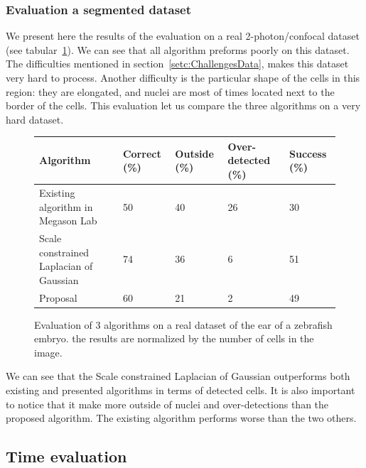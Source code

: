 \subsubsection{Evaluation a segmented dataset}

We present here the results of the evaluation on a real 2-photon/confocal dataset (see tabular~\ref{tab:realEval}). We can see that all algorithm preforms poorly on this dataset.
The difficulties mentioned in section~\ref{setc:ChallengesData}, makes this dataset very hard to process. Another difficulty is the particular shape of the cells in this region: they are elongated, and nuclei are most of times located next to the border of the cells.
This evaluation let us compare the three algorithms on a very hard dataset.
\begin{figure}[htb]
\begin{center}
\begin{tabular}{|p{2.5cm}|l|l|p{1.3cm}|l|}
\hline Algorithm & Correct (\%) & Outside (\%) & Over-detected (\%) & Success (\%) \\ 
\hline Existing algorithm in Megason Lab & 50 & 40 & 26 & 30 \\ 
\hline Scale constrained Laplacian of Gaussian &  74 & 36 & 6 & 51 \\ 
\hline Proposal & 60 & 21 & 2 & 49 \\
\hline
\end{tabular}
\end{center}
\caption{Evaluation of 3 algorithms on a real dataset of the ear of a zebrafish embryo. the results are normalized by the number of cells in the image.}
\label{tab:realEval}
\end{figure}

We can see that the Scale constrained Laplacian of Gaussian outperforms both existing and presented algorithms in terms of detected cells.
It is also important to notice that it make more outside of nuclei and over-detections than the proposed algorithm.
The existing algorithm performs worse than the two others.


\subsection{Time evaluation}

